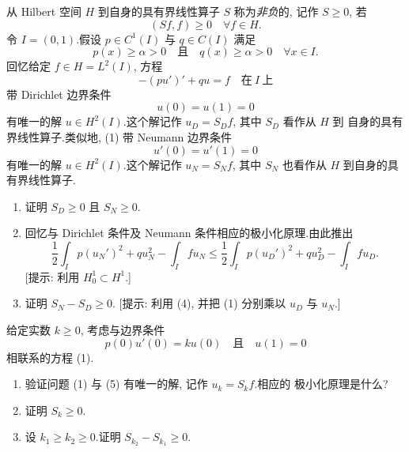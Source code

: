 \begin{exercise}
\label{exer:8.26}
从 Hilbert 空间 $H$ 到自身的具有界线性算子 $S$ 称为\emph{非负}的, 记作
$S\ge0$, 若
\begin{equation*}
(Sf,f)\ge0\quad\forall f\in H.
\end{equation*}
令 $I=(0,1)$.假设 $p\in C^1(I)$ 与 $q\in C(I)$ 满足
\begin{equation*}
p(x)\ge\alpha>0\quad\text{且}\quad q(x)\ge\alpha>0\quad\forall x\in I.
\end{equation*}
回忆给定 $f\in H=L^2(I)$, 方程
\begin{equation}
-(pu')'+qu=f\quad\text{在}\ I\ \text{上}
\tag{1}
\end{equation}
带 Dirichlet 边界条件
\begin{equation}
u(0)=u(1)=0
\tag{2}
\end{equation}
有唯一的解 $u\in H^2(I)$.这个解记作 $u_D=S_Df$, 其中 $S_D$ 看作从 $H$ 到
自身的具有界线性算子.类似地, (1) 带 Neumann 边界条件
\begin{equation}
u'(0)=u'(1)=0
\tag{3}
\end{equation}
有唯一的解 $u\in H^2(I)$.这个解记作 $u_N=S_Nf$, 其中 $S_N$ 也看作从 $H$
到自身的具有界线性算子.
\begin{enumerate}[label=\arabic*., leftmargin=2.2em, itemsep=0.3em]
	\item 证明 $S_D\ge0$ 且 $S_N\ge0$.
	\item 回忆与 Dirichlet 条件及 Neumann 条件相应的极小化原理.由此推出
	      \begin{equation}
	      \frac12\int_Ip(u_N')^2+qu_N^2-\int_Ifu_N
	      \le\frac12\int_Ip(u_D')^2+qu_D^2-\int_Ifu_D.
	      \tag{4}
	      \end{equation}
	      [提示: 利用 $H_0^1\subset H^1$.]
	\item 证明 $S_N-S_D\ge0$.
	      [提示: 利用 (4), 并把 (1) 分别乘以 $u_D$ 与 $u_N$.]
\end{enumerate}
给定实数 $k\ge0$, 考虑与边界条件
\begin{equation}
p(0)u'(0)=ku(0)\quad\text{且}\quad u(1)=0
\tag{5}
\end{equation}
相联系的方程 (1).
\begin{enumerate}[label=\arabic*., leftmargin=2.2em, itemsep=0.3em, start=4]
	\item 验证问题 (1) 与 (5) 有唯一的解, 记作 $u_k=S_kf$.相应的
	      极小化原理是什么?
	\item 证明 $S_k\ge0$.
	\item 设 $k_1\ge k_2\ge0$.证明 $S_{k_2}-S_{k_1}\ge0$.
\end{enumerate}
\end{exercise}

